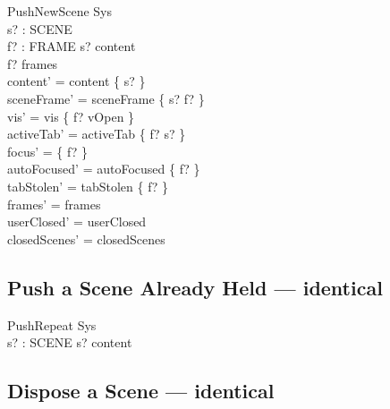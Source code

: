 \documentclass[a4paper,10pt,fleqn]{article}
\begin{document}
\begin{schema}{PushNewScene}
  \Delta Sys \\
  s? : SCENE \\
  f? : FRAME
\where
  s? \notin content \\
  f? \in frames \\
  content' = content \cup \{ s? \} \\
  sceneFrame' = sceneFrame \cup \{ s? \mapsto f? \} \\
  vis' = vis \oplus \{ f? \mapsto vOpen \} \\
  activeTab' = activeTab \oplus \{ f? \mapsto s? \} \\
  focus' = \{ f? \} \\
  autoFocused' = autoFocused \cup \{ f? \} \\
  tabStolen' = tabStolen \cup \{ f? \} \\
  frames' = frames \\
  userClosed' = userClosed \\
  closedScenes' = closedScenes
\end{schema}

\subsection{Push a Scene Already Held --- identical}

\begin{schema}{PushRepeat}
  \Xi Sys \\
  s? : SCENE
\where
  s? \in content
\end{schema}

\subsection{Dispose a Scene --- identical}
\end{document}
